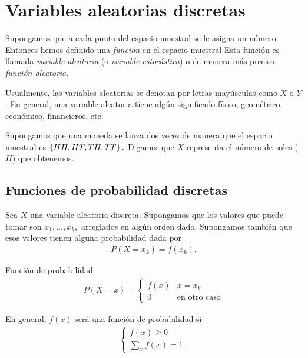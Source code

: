 
\section{Variables aleatorias discretas}

Supongamos que a cada punto del espacio muestral se le asigna un número.  Entonces hemos definido una \emph{función} en el espacio muestral  Esta función es llamada \emph{variable aleatoria} (o \emph{variable estocástica}) o de manera más precisa \emph{función aleatoria}. 


Usualmente, las variables aleatorias se denotan por letras mayúsculas como $X$ o $Y$. En general, una variable aleatoria tiene algún significado físico, geométrico, económico, financieros, etc.



\begin{ejemplo}
	\label{exmp:2.1}
	Supongamos que una moneda se lanza dos veces de manera que el espacio muestral es $\left\{ HH,HT,TH,TT \right\}.$  Digamos que $X$ representa el número de soles ($H$) que obtenemos.
\end{ejemplo}


\subsection{Funciones de probabilidad discretas}

Sea $X$ una variable aleatoria discreta.  Supongamos que los valores que puede tomar son $x_{1},...,x_{k},$ arreglados en algún orden dado.  Supongamos también que esos valores
tienen alguna probabilidad dada por
\begin{align}
	\label{2.1}
	P(X=x_{k})=f(x_{k}).
\end{align}


{Función de probabilidad}
\begin{align}
	\label{2.2}
	P(X=x)=
	\begin{cases}
		f(x) & x=x_{k} \\
		0	& \text{en otro caso}
	\end{cases}
\end{align}



En general, $f(x)$ será una función de probabilidad si
\begin{align}
	\begin{cases}
		f(x)\geq 0 \\
		\sum_{x}f(x)=1.
	\end{cases}
\end{align}



